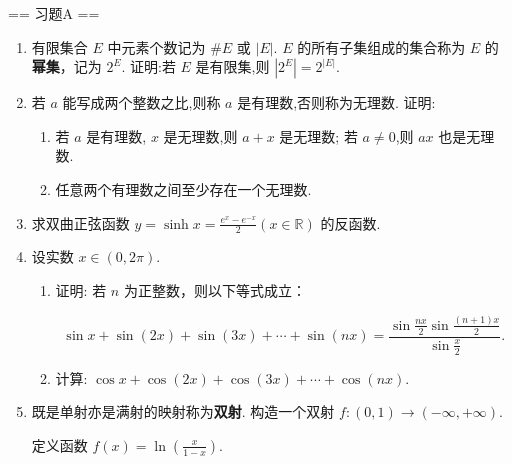 \newenvironment{solution}{\begin{proofc}[解答]}{\end{proofc}}

== 习题A ==

\begin{enumerate}
    \item[1.]有限集合 $E$ 中元素个数记为 $\# E$ 或 $|E|$. 
    $E$ 的所有子集组成的集合称为 $E$ 的\textbf{幂集}，记为 $2^{E}$. 
    证明:若 $E$ 是有限集,则 $|2^{E}| = 2^{|E|}$.

    \item[2.]若 $a$ 能写成两个整数之比,则称 $a$ 是有理数,否则称为无理数. 证明:
    \begin{enumerate}
    \item[(a)]若 $a$ 是有理数, $x$ 是无理数,则 $a + x$ 是无理数;
    若 $a\neq 0$,则 $ax$ 也是无理数.
    \item[(b)]任意两个有理数之间至少存在一个无理数.
    \end{enumerate}

    \item[3.]求双曲正弦函数 $\displaystyle y = \sinh x = \frac{e^{x} - e^{-x}}{2} (x\in \mathbb{R})$ 的反函数.

    \item[4.]设实数 $x\in (0,2\pi)$.
    \begin{enumerate}
    \item[(a)]证明: 若 $n$ 为正整数，则以下等式成立：

    \[\sin x + \sin (2x) + \sin (3x) + \cdots +\sin (nx) 
    = \frac{\sin\frac{nx}{2}\sin\frac{(n + 1)x}{2}}{\sin\frac{x}{2}}.\]
    
    \item[(b)]计算: $\cos x + \cos (2x) + \cos (3x) + \cdots +\cos (nx).$
    \end{enumerate}

    \item[5.]既是单射亦是满射的映射称为\textbf{双射}. 构造一个双射 $f:(0,1)\to (-\infty, + \infty).$
    \begin{solution}
        定义函数 $\displaystyle f(x) = \ln\left(\frac{x}{1-x}\right)$.


\end{solution}
\end{enumerate}
